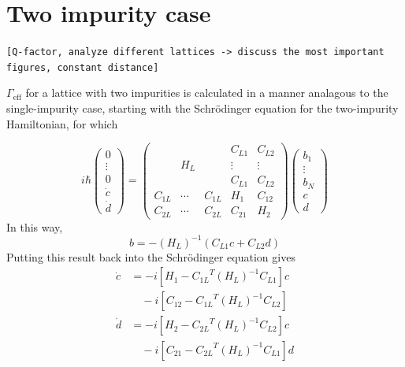 \documentclass[aps,pra,superscriptaddress,twocolumn]{revtex4-1}
\newcommand{\commentSB}[1]{\texttt{\color{blue}[#1]}}
\newcommand{\commentSO}[1]{\texttt{\color{orange}[#1]}}
\begin{document}
\section{Two impurity case}
\commentSO{Q-factor, analyze different lattices -> discuss the most important figures, constant distance}

$\Gamma_\text{eff}$ for a lattice with two impurities is calculated in a manner analagous to the single-impurity case, starting with the Schr\"odinger equation for the two-impurity Hamiltonian, for which 

\begin{equation}
    i \hbar \begin{pmatrix}
        0 \\ \vdots \\ 0 \\ \dot{c} \\ \dot{d}
    \end{pmatrix}
    = \begin{pmatrix}
        ~ & ~ & ~ &   C_{L1} & C_{L2} \\ 
        ~ & H_L & ~ & \vdots & \vdots \\
        ~ & ~ & ~ & C_{L1} &  C_{L2} \\
        C_{1L} & \cdots & C_{1L} & H_1 & C_{12} \\
        C_{2L} & \cdots & C_{2L} & C_{21} & H_2  
    \end{pmatrix} 
    \begin{pmatrix}
        b_1 \\ \vdots \\ b_N \\ c \\ d
    \end{pmatrix}
    \label{eqn:blockH2}
\end{equation} 
In this way, 
\begin{equation}
    b = -(H_L)^{-1} (C_{L1} c + C_{L2} d)
\end{equation}
Putting this result back into the Schr\"odinger equation gives
\begin{subequations}
\begin{align}
    \dot{c} &= -i \left[  H_1 - {C_{1L}}^T (H_L)^{-1} C_{L1}\right] c \nonumber\\
     &\quad- i \left[  C_{12} - {C_{1L}}^T (H_L)^{-1} C_{L2} \right]  \\
    \dot{d} &= -i \left[  H_2 - {C_{2L}}^T (H_L)^{-1} C_{L2}\right] c \nonumber\\
     &\quad- i \left[  C_{21} - {C_{2L}}^T (H_L)^{-1} C_{L1} \right] d 
\end{align}
\end{subequations}
\end{document}
